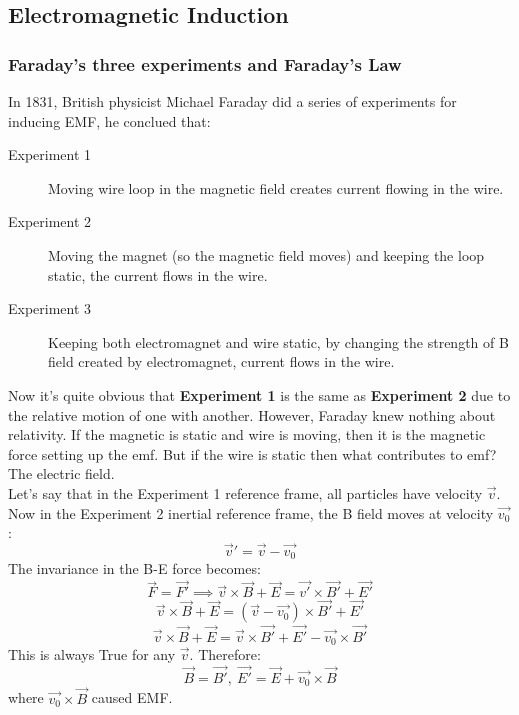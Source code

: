\documentclass[12pt,a4paper,twoside]{article}
\numberwithin{equation}{section}
\begin{document}
\subsection{Electromagnetic Induction}
\subsubsection{Faraday's three experiments and Faraday's Law}
In 1831, British physicist Michael Faraday did a series of experiments for inducing EMF, he conclued that:
\begin{description}
    \item[Experiment 1] Moving wire loop in the magnetic field creates current flowing in the wire.
    \item[Experiment 2] Moving the magnet (so the magnetic field moves) and keeping the loop static, the current flows in the wire.
    \item[Experiment 3] Keeping both  electromagnet and wire static, by changing the strength of B field created by electromagnet, current flows in the wire.
\end{description}
Now it's quite obvious that \textbf{Experiment 1} is the same as \textbf{Experiment 2} due to the relative motion of one with another. However, Faraday knew nothing about relativity. If the magnetic is static and wire is moving, then it is the magnetic force setting up the emf. But if the wire is static then what contributes to emf? The electric field.\\

\noindent Let's say that in the Experiment 1 reference frame, all particles have velocity $\overrightarrow{v}$. Now in the Experiment 2 inertial reference frame, the B field moves at velocity $\overrightarrow{v_0}$:
\[\overrightarrow{v}'=\overrightarrow{v}-\overrightarrow{v_0}\]
The invariance in the B-E force becomes:
\[\overrightarrow{F}=\overrightarrow{F'}\implies \overrightarrow{v}\times \overrightarrow{B}+\overrightarrow{E}=\overrightarrow{v'}\times\overrightarrow{B'}+\overrightarrow{E'}\]
\[\overrightarrow{v}\times \overrightarrow{B}+\overrightarrow{E}=(\overrightarrow{v}-\overrightarrow{v_0})\times\overrightarrow{B'}+\overrightarrow{E'}\]
\[\overrightarrow{v}\times \overrightarrow{B}+\overrightarrow{E}=\overrightarrow{v}\times \overrightarrow{B'}+\overrightarrow{E'}-\overrightarrow{v_0}\times\overrightarrow{B'}\]
This is always True for any $\overrightarrow{v}$. Therefore:
\[\overrightarrow{B}=\overrightarrow{B'},\ \overrightarrow{E'}=\overrightarrow{E}+\overrightarrow{v_0}\times\overrightarrow{B}\]
where $\overrightarrow{v_0}\times \overrightarrow{B}$ caused EMF.\\
\end{document}
